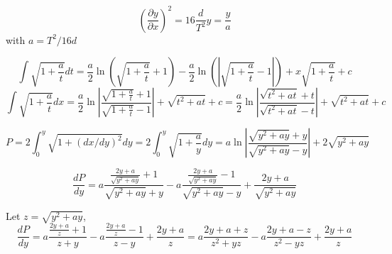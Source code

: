 \begin{equation}  
\left(\frac{\partial y}{\partial x}\right)^2= 16\frac{d}{T^2}y =  \frac{y}{a}
\end{equation}
with $a = T^2/16d$

\begin{equation}  
\int \sqrt{1+\frac{a}{t}}dt = \frac{a}{2}\ln\left(\sqrt{1+\frac{a}{t}} +1\right) 
                                              - \frac{a}{2}\ln\left(|\sqrt{1+\frac{a}{t}} -1|\right)
                                             + x\sqrt{1+\frac{a}{t}} + c 
\end{equation}
\begin{equation}  
\int \sqrt{1+\frac{a}{t}}dx = \frac{a}{2}\ln \left| \frac{\sqrt{1+\frac{a}{t}} +1}{\sqrt{1+\frac{a}{t}} -1}\right| 
                                             + \sqrt{t^2+at} + c 
                                             = \frac{a}{2}\ln \left| \frac{\sqrt{t^2+at} +t}{\sqrt{t^2+at} -t}\right| 
                                             + \sqrt{t^2+at} + c 
\end{equation}

\begin{equation}  
P= 2\int_0^y \sqrt{1 + (dx/dy)^2}dy = 2\int_0^y \sqrt{1 + \frac{a}{y}} dy 
= a \ln \left| \frac{\sqrt{y^2 + ay} + y}{\sqrt{y^2 + ay} -  y} \right| 
+ 2\sqrt{y^2 + ay}
\end{equation}

\begin{equation}  
\frac{dP}{dy}= a \frac{\frac{2y + a}{\sqrt{y^2 + ay}} + 1}{\sqrt{y^2 + ay} + y}
                       - a \frac{\frac{2y + a}{\sqrt{y^2+ay}}-1}{\sqrt{y^2 + ay}-y}
                       + \frac{2y + a}{\sqrt{y^2+ay}}
\end{equation}

Let $z = \sqrt{y^2 + ay}$, 
\begin{equation}  
\frac{dP}{dy} = a \frac{\frac{2y + a}{z} + 1}{z + y} - a \frac{\frac{2y + a}{z}-1}{z-y} + \frac{2y + a}{z}
                       = a \frac{2y + a + z}{z^2 + yz} - a \frac{2y + a - z}{z^2 - yz} + \frac{2y + a}{z}
\end{equation}

